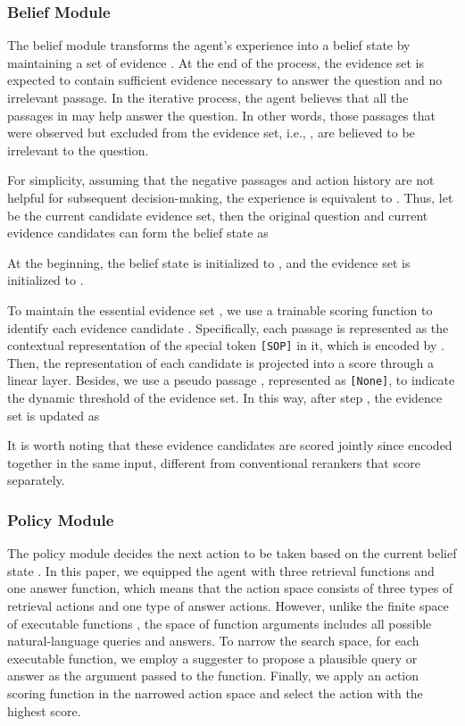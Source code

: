 \documentclass[11pt]{article}
\begin{document}
\subsubsection{Belief Module}\label{belief}
The belief module  transforms the agent's experience  into a belief state  by maintaining a set of evidence .
At the end of the process, the evidence set  is expected to contain sufficient evidence necessary to answer the question and no irrelevant passage.
In the iterative process, the agent believes that all the passages in  may help answer the question.
In other words, those passages that were observed but excluded from the evidence set, i.e., , are believed to be irrelevant to the question.

For simplicity, assuming that the negative passages  and action history  are not helpful for subsequent decision-making, the experience  is equivalent to .
Thus, let  be the current candidate evidence set, then the original question and current evidence candidates can form the belief state  as

At the beginning, the belief state  is initialized to , and the evidence set  is initialized to .

To maintain the essential evidence set , we use a trainable scoring function  to identify each evidence candidate .
Specifically, each passage is represented as the contextual representation of the special token \verb|[SOP]| in it, which is encoded by .
Then, the representation of each candidate is projected into a score through a linear layer.
Besides, we use a pseudo passage , represented as \verb|[None]|, to indicate the dynamic threshold of the evidence set.
In this way, after step , the evidence set is updated as

It is worth noting that these evidence candidates are scored jointly since encoded together in the same input, different from conventional rerankers that score separately.

\subsubsection{Policy Module}\label{policy}
The policy module  decides the next action  to be taken based on the current belief state .
In this paper, we equipped the agent with three retrieval functions and one answer function, which means that the action space  consists of three types of retrieval actions and one type of answer actions.
However, unlike the finite space of executable functions , the space of function arguments  includes all possible natural-language queries and answers.
To narrow the search space, for each executable function, we employ a suggester to propose a plausible query or answer as the argument passed to the function.
Finally, we apply an action scoring function in the narrowed action space and select the action with the highest score.
\end{document}
